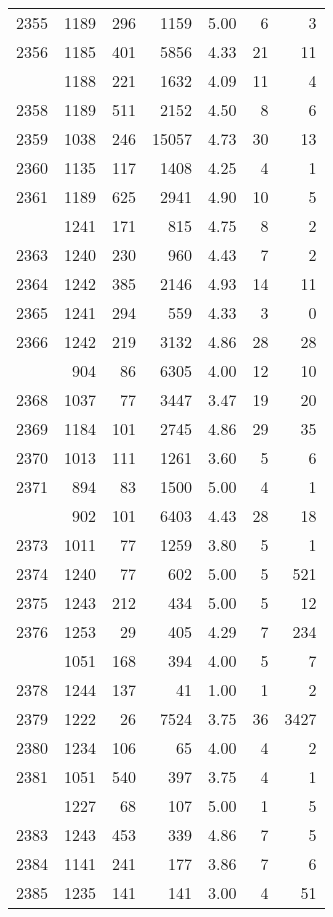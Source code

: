 \documentclass[
]{article}
\begin{document}
\begin{table}
\begin{tabular}[t]{lrrrrrr}
2355 & 1189 & 296 & 1159 & 5.00 & 6 & 3\\
2356 & 1185 & 401 & 5856 & 4.33 & 21 & 11\\
\addlinespace
2357 & 1188 & 221 & 1632 & 4.09 & 11 & 4\\
2358 & 1189 & 511 & 2152 & 4.50 & 8 & 6\\
2359 & 1038 & 246 & 15057 & 4.73 & 30 & 13\\
2360 & 1135 & 117 & 1408 & 4.25 & 4 & 1\\
2361 & 1189 & 625 & 2941 & 4.90 & 10 & 5\\
\addlinespace
2362 & 1241 & 171 & 815 & 4.75 & 8 & 2\\
2363 & 1240 & 230 & 960 & 4.43 & 7 & 2\\
2364 & 1242 & 385 & 2146 & 4.93 & 14 & 11\\
2365 & 1241 & 294 & 559 & 4.33 & 3 & 0\\
2366 & 1242 & 219 & 3132 & 4.86 & 28 & 28\\
\addlinespace
2367 & 904 & 86 & 6305 & 4.00 & 12 & 10\\
2368 & 1037 & 77 & 3447 & 3.47 & 19 & 20\\
2369 & 1184 & 101 & 2745 & 4.86 & 29 & 35\\
2370 & 1013 & 111 & 1261 & 3.60 & 5 & 6\\
2371 & 894 & 83 & 1500 & 5.00 & 4 & 1\\
\addlinespace
2372 & 902 & 101 & 6403 & 4.43 & 28 & 18\\
2373 & 1011 & 77 & 1259 & 3.80 & 5 & 1\\
2374 & 1240 & 77 & 602 & 5.00 & 5 & 521\\
2375 & 1243 & 212 & 434 & 5.00 & 5 & 12\\
2376 & 1253 & 29 & 405 & 4.29 & 7 & 234\\
\addlinespace
2377 & 1051 & 168 & 394 & 4.00 & 5 & 7\\
2378 & 1244 & 137 & 41 & 1.00 & 1 & 2\\
2379 & 1222 & 26 & 7524 & 3.75 & 36 & 3427\\
2380 & 1234 & 106 & 65 & 4.00 & 4 & 2\\
2381 & 1051 & 540 & 397 & 3.75 & 4 & 1\\
\addlinespace
2382 & 1227 & 68 & 107 & 5.00 & 1 & 5\\
2383 & 1243 & 453 & 339 & 4.86 & 7 & 5\\
2384 & 1141 & 241 & 177 & 3.86 & 7 & 6\\
2385 & 1235 & 141 & 141 & 3.00 & 4 & 51\\

\end{tabular}
\end{table}
\end{document}
